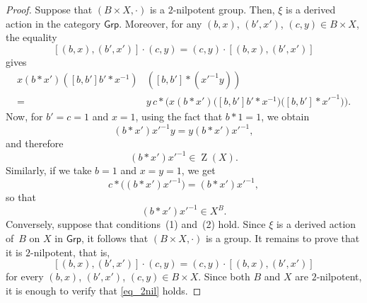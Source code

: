 \documentclass[10pt,a4paper]{amsart}
\newcommand{\Grp}{\ensuremath{\mathsf{Grp}}}
\DeclareMathOperator{\bZ}{Z}
\begin{document}
\begin{proof}
    Suppose that \((B \times X,\cdot)\) is a \(2\)-nilpotent group. Then, \(\xi\) is a derived action in the category \(\Grp\). Moreover, for any \((b,x)\), \((b',x')\), \((c,y)\in B\times X\), the equality
    \[
        [(b,x),(b',x')] \cdot (c,y)=(c,y) \cdot [(b,x),(b',x')]
    \]
    gives
    \begin{equation}\label{eq_2nil}
        \begin{split}
            x(b \ast x')([b,b']b' \ast x^{-1}) & ([b,b'] \ast (x'^{-1}y))                                                                            \\
            =                                  & y\, c \ast \bigl(x(b \ast x')\bigl([b,b']b' \ast x^{-1}\bigr)\bigl([b,b'] \ast x'^{-1}\bigr)\bigr).
        \end{split}
    \end{equation}
    Now, for \(b'=c=1\) and \(x=1\), using the fact that \(b \ast 1=1\), we obtain
    \[
        (b \ast x')x'^{-1}y=y(b \ast x')x'^{-1},
    \]
    and therefore
    \[
        (b \ast x')x'^{-1}\in \bZ(X).
    \]
    Similarly, if we take \(b=1\) and \(x=y=1\), we get
    \[
        c \ast \bigl((b \ast x')x'^{-1}\bigr)=(b \ast x')x'^{-1},
    \]
    so that
    \[
        (b \ast x')x'^{-1}\in X^B.
    \]
    Conversely, suppose that conditions~(1) and~(2) hold. Since \(\xi\) is a derived action of~\(B\) on \(X\) in \(\Grp\), it follows that \((B \times X,\cdot)\) is a group. It remains to prove that it is \(2\)-nilpotent, that is,
    \[
        [(b,x),(b',x')] \cdot (c,y)=(c,y)\cdot [(b,x),(b',x')]
    \]
    for every \((b,x)\), \((b',x')\), \((c,y)\in B\times X\). Since both \(B\) and \(X\) are \(2\)-nilpotent, it is enough to verify that \eqref{eq_2nil} holds.


\end{proof}
\end{document}

